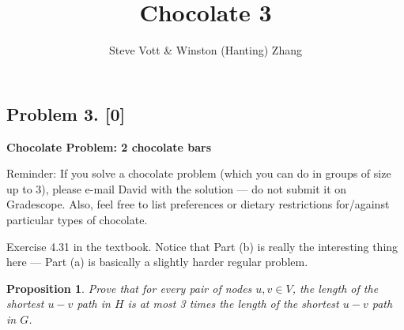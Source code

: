 \documentclass[10pt]{article}
\title{\bf Chocolate 3}
\author{Steve Vott \& Winston (Hanting) Zhang}
\newtheorem{proposition}[lemma]{Proposition}
\begin{document}
\maketitle

\subsection*{Problem 3. [0]}
\textbf{Chocolate Problem: 2 chocolate bars}

Reminder: If you solve a chocolate problem (which you can do in groups of size up to 3), please e-mail David with the solution --- do not submit it on Gradescope. Also, feel free to list preferences or dietary restrictions for/against particular types of chocolate.

Exercise 4.31 in the textbook. Notice that Part (b) is really the interesting thing here --- Part (a) is basically a slightly harder regular problem.

\begin{proposition}
  Prove that for every pair of nodes \(u, v \in V\), the length of the shortest \(u-v\) path in \(H\) is at most 3 times the length of the shortest \(u-v\) path in \(G\). 
\end{proposition}
\end{document}
